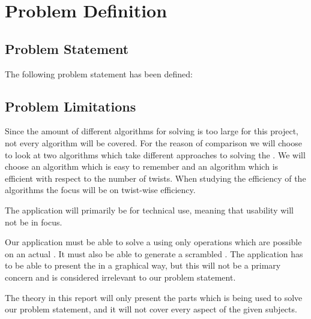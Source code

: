 \chapter{Problem Definition}
\emptyTop{}
\section{Problem Statement}
The following problem statement has been defined:

\vspace{2mm}
\begin{centering}
\hspace{2mm}
\end{centering}
\section{Problem Limitations}
\label{sec:problemLimitations}
Since the amount of different algorithms for \rubik{} solving is too large for this project, not every algorithm will be covered.
For the reason of comparison we will choose to look at two algorithms which take different approaches to solving the \rubik{}. We will choose an algorithm which is easy to remember and an algorithm which is efficient with respect to the number of twists. When studying the efficiency of the algorithms the focus will be on twist-wise efficiency.

The \rubik{} application will primarily be for technical use, meaning that usability will not be in focus.

Our application must be able to solve a \rubik{} using only operations which are possible on an actual \rubik{}.
It must also be able to generate a scrambled \rubik{}.
The application has to be able to present the \rubik{} in a graphical way, but this will not be a primary concern and is considered irrelevant to our problem statement. 

The theory in this report will only present the parts which is being used to solve our problem statement, and it will not cover every aspect of the given subjects.